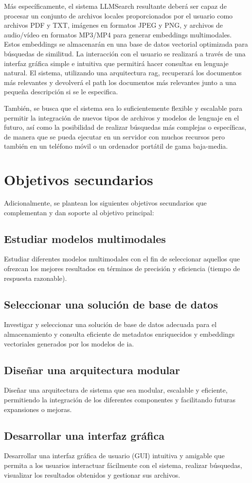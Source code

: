Más específicamente, el sistema LLMSearch resultante deberá ser capaz de procesar un conjunto de archivos locales proporcionados por el usuario como archivos PDF y TXT, imágenes en formatos JPEG y PNG, y archivos de audio/vídeo en formatos MP3/MP4 para generar embeddings multimodales. Estos embeddings se almacenarán en una base de datos vectorial optimizada para búsquedas de similitud. La interacción con el usuario se realizará a través de una interfaz gráfica simple e intuitiva que permitirá hacer consultas en lenguaje natural. El sistema, utilizando una arquitectura \gls{rag}, recuperará los documentos más relevantes y devolverá el path los documentos más relevantes junto a una pequeña descripción si se le especifica.

También, se busca que el sistema sea lo suficientemente flexible y escalable para permitir la integración de nuevos tipos de archivos y modelos de lenguaje en el futuro, así como la posibilidad de realizar búsquedas más complejas o específicas, de manera que se pueda ejecutar en un servidor con muchos recursos pero también en un teléfono móvil o un ordenador portátil de gama baja-media.

\section{Objetivos secundarios}
Adicionalmente, se plantean los siguientes objetivos secundarios que complementan y dan soporte al objetivo principal:
\subsection{Estudiar modelos multimodales}
Estudiar diferentes modelos multimodales con el fin de seleccionar aquellos que ofrezcan los mejores resultados en términos de precisión y eficiencia (tiempo de respuesta razonable).
\subsection{Seleccionar una solución de base de datos}
Investigar y seleccionar una solución de base de datos adecuada para el almacenamiento y consulta eficiente de metadatos enriquecidos y embeddings vectoriales generados por los modelos de \gls{ia}.
\subsection{Diseñar una arquitectura modular}
Diseñar una arquitectura de sistema que sea modular, escalable y eficiente, permitiendo la integración de los diferentes componentes y facilitando futuras expansiones o mejoras.
\subsection{Desarrollar una interfaz gráfica}
Desarrollar una interfaz gráfica de usuario (GUI) intuitiva y amigable que permita a los usuarios interactuar fácilmente con el sistema, realizar búsquedas, visualizar los resultados obtenidos y gestionar sus archivos.
